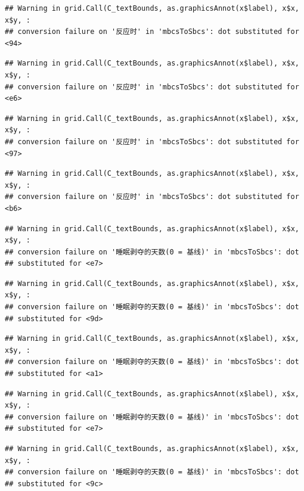 \documentclass[
]{book}
\begin{document}
\begin{verbatim}
## Warning in grid.Call(C_textBounds, as.graphicsAnnot(x$label), x$x, x$y, :
## conversion failure on '反应时' in 'mbcsToSbcs': dot substituted for <94>
\end{verbatim}

\begin{verbatim}
## Warning in grid.Call(C_textBounds, as.graphicsAnnot(x$label), x$x, x$y, :
## conversion failure on '反应时' in 'mbcsToSbcs': dot substituted for <e6>
\end{verbatim}

\begin{verbatim}
## Warning in grid.Call(C_textBounds, as.graphicsAnnot(x$label), x$x, x$y, :
## conversion failure on '反应时' in 'mbcsToSbcs': dot substituted for <97>
\end{verbatim}

\begin{verbatim}
## Warning in grid.Call(C_textBounds, as.graphicsAnnot(x$label), x$x, x$y, :
## conversion failure on '反应时' in 'mbcsToSbcs': dot substituted for <b6>
\end{verbatim}

\begin{verbatim}
## Warning in grid.Call(C_textBounds, as.graphicsAnnot(x$label), x$x, x$y, :
## conversion failure on '睡眠剥夺的天数(0 = 基线)' in 'mbcsToSbcs': dot
## substituted for <e7>
\end{verbatim}

\begin{verbatim}
## Warning in grid.Call(C_textBounds, as.graphicsAnnot(x$label), x$x, x$y, :
## conversion failure on '睡眠剥夺的天数(0 = 基线)' in 'mbcsToSbcs': dot
## substituted for <9d>
\end{verbatim}

\begin{verbatim}
## Warning in grid.Call(C_textBounds, as.graphicsAnnot(x$label), x$x, x$y, :
## conversion failure on '睡眠剥夺的天数(0 = 基线)' in 'mbcsToSbcs': dot
## substituted for <a1>
\end{verbatim}

\begin{verbatim}
## Warning in grid.Call(C_textBounds, as.graphicsAnnot(x$label), x$x, x$y, :
## conversion failure on '睡眠剥夺的天数(0 = 基线)' in 'mbcsToSbcs': dot
## substituted for <e7>
\end{verbatim}

\begin{verbatim}
## Warning in grid.Call(C_textBounds, as.graphicsAnnot(x$label), x$x, x$y, :
## conversion failure on '睡眠剥夺的天数(0 = 基线)' in 'mbcsToSbcs': dot
## substituted for <9c>
\end{verbatim}
\end{document}
